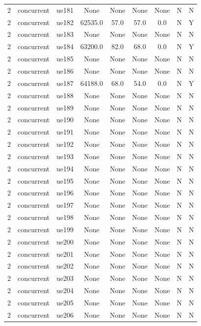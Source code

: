 \begin{table}[ht]
\begin{tabular}{|c|c|c|c|c|c|c|c|c|}
2 & concurrent & ue181 & None & None & None & None & N & N \\
2 & concurrent & ue182 & 62535.0 & 57.0 & 57.0 & 0.0 & N & Y \\
2 & concurrent & ue183 & None & None & None & None & N & N \\
2 & concurrent & ue184 & 63200.0 & 82.0 & 68.0 & 0.0 & N & Y \\
2 & concurrent & ue185 & None & None & None & None & N & N \\
2 & concurrent & ue186 & None & None & None & None & N & N \\
2 & concurrent & ue187 & 64188.0 & 68.0 & 54.0 & 0.0 & N & Y \\
2 & concurrent & ue188 & None & None & None & None & N & N \\
2 & concurrent & ue189 & None & None & None & None & N & N \\
2 & concurrent & ue190 & None & None & None & None & N & N \\
2 & concurrent & ue191 & None & None & None & None & N & N \\
2 & concurrent & ue192 & None & None & None & None & N & N \\
2 & concurrent & ue193 & None & None & None & None & N & N \\
2 & concurrent & ue194 & None & None & None & None & N & N \\
2 & concurrent & ue195 & None & None & None & None & N & N \\
2 & concurrent & ue196 & None & None & None & None & N & N \\
2 & concurrent & ue197 & None & None & None & None & N & N \\
2 & concurrent & ue198 & None & None & None & None & N & N \\
2 & concurrent & ue199 & None & None & None & None & N & N \\
2 & concurrent & ue200 & None & None & None & None & N & N \\
2 & concurrent & ue201 & None & None & None & None & N & N \\
2 & concurrent & ue202 & None & None & None & None & N & N \\
2 & concurrent & ue203 & None & None & None & None & N & N \\
2 & concurrent & ue204 & None & None & None & None & N & N \\
2 & concurrent & ue205 & None & None & None & None & N & N \\
2 & concurrent & ue206 & None & None & None & None & N & N \\

\end{tabular}
\end{table}

